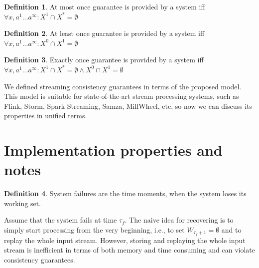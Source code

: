 \documentclass[sigconf]{acmart}
\theoremstyle{definition}
\newtheorem{definition}{Definition}
\begin{document}
\begin{definition}{At most once}
guarantee is provided by a system iff $\forall{x,a^{1}...a^\infty}:X^{1}\cap{X^{*}}=\emptyset$
\end{definition}

\begin{definition}{At least once}
guarantee is provided by a system iff $\forall{x,a^{1}...a^\infty}:X^{0}\cap{X^{1}}=\emptyset$
\end{definition}

\begin{definition}{Exactly once}
guarantee is provided by a system iff $\forall{x,a^{1}...a^\infty}:X^{1}\cap{X^{*}}=\emptyset \wedge X^{0}\cap{X^{1}}=\emptyset$
\end{definition}


We defined streaming consistency guarantees in terms of the proposed model. This model is suitable for state-of-the-art stream processing systems, such as Flink, Storm, Spark Streaming, Samza, MillWheel, etc, so now we can discuss its properties in unified terms.

\section{Implementation properties and notes}


\begin{definition}{System failures}
are the time moments, when the system loses its working set. 
\end{definition}

Assume that the system fails at time $\tau_f$. The naive idea for recovering is to simply start processing from the very beginning, i.e., to set $W_{\tau_f+1}=\emptyset$ and to replay the whole input stream. However, storing and replaying the whole input stream is inefficient in terms of both memory and time consuming and can violate consistency guarantees.
\end{document}
